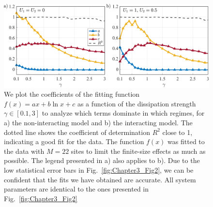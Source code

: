 \begin{figure}[ht]
    \centering
    \includegraphics[width=\textwidth]{Chapters/Plots/Chapter4/Chapter3_Fig3.pdf}
    \caption{We plot the coefficients of the fitting function $f(x) = a x + b \ln{x} + c$ as a function of the dissipation strength $\gamma \in [0.1, 3]$ to analyze which terms dominate in which regimes, for a) the non-interacting model and b) the interacting model. The dotted line shows the coefficient of determination $R^2$ close to 1, indicating a good fit for the data. The function $f(x)$ was fitted to the data with $M = 22$ sites to limit the finite-size effects as much as possible. The legend presented in a) also applies to b). Due to the low statistical error bars in Fig.~\ref{fig:Chapter3_Fig2}, we can be confident that the fits we have obtained are accurate. All system parameters are identical to the ones presented in Fig.~\ref{fig:Chapter3_Fig2}}
    \label{fig:Chapter3_Fig3}
\end{figure}

